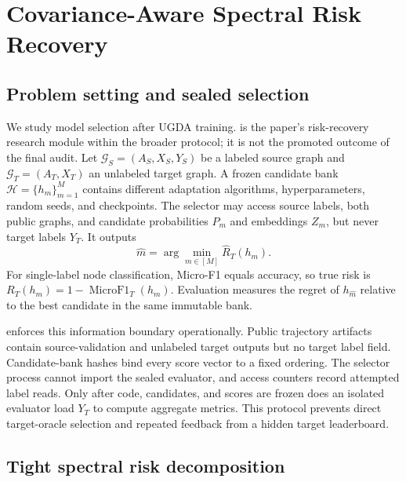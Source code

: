 \section{Covariance-Aware Spectral Risk Recovery}
\label{sec:method}

\subsection{Problem setting and sealed selection}

We study model selection after UGDA training. \method is the paper's
risk-recovery research module within the broader \benchmark protocol; it is
not the promoted outcome of the final audit. Let
$\mathcal G_S=(A_S,X_S,Y_S)$ be a labeled source graph and
$\mathcal G_T=(A_T,X_T)$ an unlabeled target graph. A frozen candidate bank
$\mathcal H=\{h_m\}_{m=1}^M$ contains different adaptation algorithms,
hyperparameters, random seeds, and checkpoints. The selector may access source
labels, both public graphs, and candidate probabilities $P_m$ and embeddings
$Z_m$, but never target labels $Y_T$. It outputs
\begin{equation}
  \widehat m=\arg\min_{m\in[M]}\widehat R_T(h_m).
  \label{eq:selection}
\end{equation}
For single-label node classification, Micro-F1 equals accuracy, so true risk is
$R_T(h_m)=1-\operatorname{MicroF1}_T(h_m)$. Evaluation measures the regret of
$h_{\widehat m}$ relative to the best candidate in the same immutable bank.

\benchmark enforces this information boundary operationally. Public trajectory
artifacts contain source-validation and unlabeled target outputs but no target
label field. Candidate-bank hashes bind every score vector to a fixed ordering.
The selector process cannot import the sealed evaluator, and access counters
record attempted label reads. Only after code, candidates, and scores are
frozen does an isolated evaluator load $Y_T$ to compute aggregate metrics. This
protocol prevents direct target-oracle selection and repeated feedback from a
hidden target leaderboard.

\subsection{Tight spectral risk decomposition}

